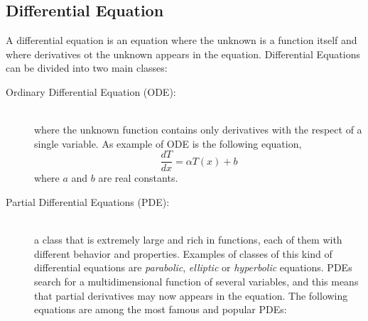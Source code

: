 \subsection{Differential Equation}
A differential equation\cite{Larsoon:2004,Mcowen:2002} is an equation where the unknown is a function itself and where derivatives ot the unknown appears in the equation.
Differential Equations can be divided into two main classes:
\begin{description}
\item[Ordinary Differential Equation (ODE):] \hfil \\ where the unknown function contains only derivatives with the respect of a single variable. As example of ODE is the following equation,
\[
  \frac{d T}{d x} = \alpha T(x) +b
\] where $a$ and $b$ are real constants.

\item [Partial Differential Equations (PDE):] \hfil \\ a class that is extremely large and rich in functions, each of them with different behavior and properties. Examples of classes of this kind of differential equations are \textit{parabolic}, \textit{elliptic} or \textit{hyperbolic} equations. PDEs search for a multidimensional function of several variables, and this means that partial derivatives may now appears in the equation. 
The following equations are among the most famous and popular PDEs:
\end{description}

